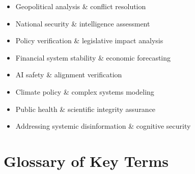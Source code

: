 \documentclass[11pt,a4paper]{article}
\begin{document}
\begin{small}
\begin{center}
\begin{minipage}{0.88\textwidth}
\begin{itemize}[nosep, itemsep=0.2em, topsep=0pt, leftmargin=1.5em]
    \item Geopolitical analysis \& conflict resolution
    \item National security \& intelligence assessment
    \item Policy verification \& legislative impact analysis
    \item Financial system stability \& economic forecasting
    \item AI safety \& alignment verification
    \item Climate policy \& complex systems modeling
    \item Public health \& scientific integrity assurance
    \item Addressing systemic disinformation \& cognitive security
\end{itemize}
\end{minipage}
\end{center}
\end{small}

\clearpage

\section*{Glossary of Key Terms}
\end{document}
